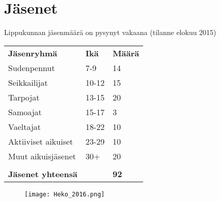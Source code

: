 \section{Jäsenet}
Lippukunnan jäsenmäärä on pysynyt vakaana (tilanne elokuu 2015)\\
\begin{center}
\begin{tabular}{ l l l }
	\textbf{Jäsenryhmä} & \textbf{Ikä} & \textbf{Määrä}\\
	Sudenpennut & 7-9 & 14\\
	Seikkailijat & 10-12 & 15\\
	Tarpojat & 13-15 & 20\\
	Samoajat & 15-17 & 3\\
	Vaeltajat & 18-22 & 10\\
	Aktiiviset aikuiset & 23-29 & 10\\
	Muut aikuisjäsenet & 30+ & 20\\
				   & & \\
	\textbf{Jäsenet yhteensä} & & \textbf{92}
\end{tabular}
\begin{figure}[htb]
	\begin{center}
		\texttt{[image: Heko\_2016.png]}
	\end{center}
\end{figure}


\end{center}
	\newpage
